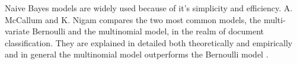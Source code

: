 	Naive Bayes models are widely used because of it's simplicity and efficiency. A. McCallum and K. Nigam compares the two most common models, the multi-variate Bernoulli and the multinomial model, in the realm of document classification. They are explained in detailed both theoretically and empirically and in general the multinomial model outperforms the Bernoulli model \cite{Zhang04optimality}.